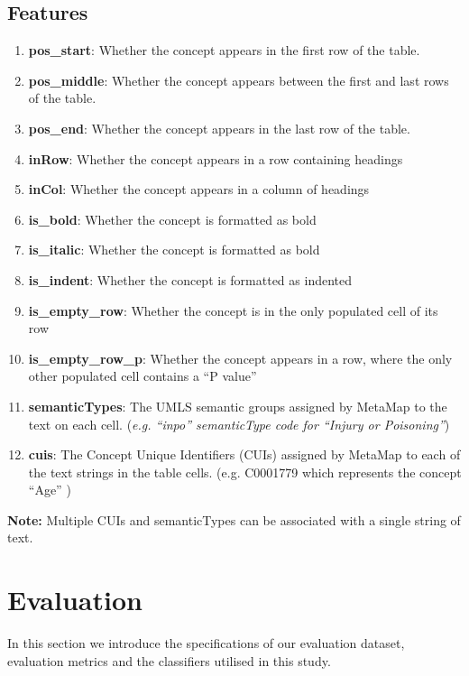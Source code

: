 \documentclass[10.7pt,]{article}
\begin{document}
\subsection{Features}\label{features}

\begin{enumerate}
	\item \textbf{pos\_start}: Whether the concept appears in the first row of the table.
	\item \textbf{pos\_middle}: Whether the concept appears between the first and last rows of the table.
	\item \textbf{pos\_end}: Whether the concept appears in the last row of the table.
	\item \textbf{inRow}: Whether the concept appears in a row containing headings 
	\item \textbf{inCol}: Whether the concept appears in a column of headings 
	\item \textbf{is\_bold}: Whether the concept is formatted as bold
	\item \textbf{is\_italic}: Whether the concept is formatted as bold
	\item \textbf{is\_indent}: Whether the concept is formatted as indented
	\item \textbf{is\_empty\_row}: Whether the concept is in the only populated cell of its row
	\item \textbf{is\_empty\_row\_p}: Whether the concept appears in a row, where the only other populated cell contains a ``P value''
	\item \textbf{semanticTypes}: The UMLS semantic groups assigned by MetaMap to the text on each cell. (\textit{e.g. ``inpo'' semanticType code for ``Injury or Poisoning''})
	\item \textbf{cuis}: The Concept Unique Identifiers (CUIs) assigned by MetaMap to each of the text strings in the table cells. (e.g. C0001779 which represents the concept ``Age'' )
\end{enumerate}

\textbf{Note:} Multiple CUIs and semanticTypes can be associated with a single string of text.

\section{Evaluation}\label{evaluation}
In this section we introduce the specifications of our evaluation dataset, evaluation metrics and the classifiers utilised in this study.
%
%
\end{document}
